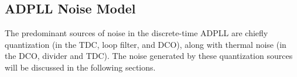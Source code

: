 
\subsection{ADPLL Noise Model} \label{pn_theory}
The predominant sources of noise in the discrete-time ADPLL are chiefly quantization (in the TDC, loop filter, and DCO), along with thermal noise (in the DCO, divider and TDC). The noise generated by these quantization sources will be discussed in the following sections.

